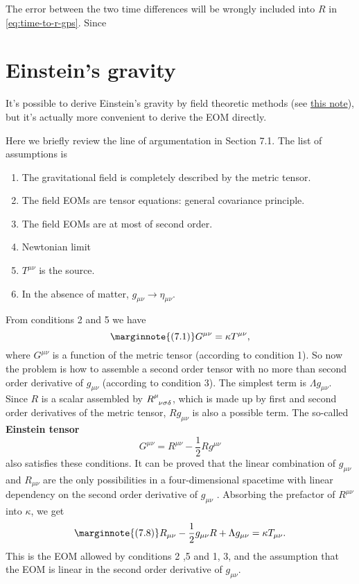 \documentclass[hyperref, a4paper]{article}
\newcommand*{\concept}[1]{{\textbf{#1}}}
\newcommand{\grnote}{\href{../relativity/relativistic.pdf}{this note}}
\begin{document}

The error between the two time differences will 
be wrongly included into $R$ in \eqref{eq:time-to-r-gps}. Since 

\section{Einstein's gravity}

It's possible to derive Einstein's gravity by field theoretic methods (see \grnote), 
but it's actually more convenient to derive the EOM directly. 

Here we briefly review the line of argumentation in Section 7.1. 
The list of assumptions is 
\begin{enumerate}
    \item The gravitational field is completely described by the metric tensor.
    \item The field EOMs are tensor equations: general covariance principle.
    \item The field EOMs are at most of second order.
    \item Newtonian limit
    \item $T^{\mu \nu}$ is the source.
    \item In the absence of matter, $g_{\mu \nu} \to \eta_{\mu \nu}$.
\end{enumerate}

From conditions 2 and 5 we have 
\begin{equation} \marginnote{(7.1)}
    G^{\mu \nu} = \kappa T^{\mu \nu},
\end{equation}
where $G^{\mu \nu}$ is a function of the metric tensor (according to condition 1). So now the problem is how to 
assemble a second order tensor with no more than second order derivative of $g_{\mu \nu}$ (according to 
condition 3). The simplest term is $\Lambda g_{\mu \nu}$. Since $R$ is a scalar assembled by 
$R\indices{^\mu_{\nu \sigma \delta}}$, which is made up by first and second order derivatives of the metric tensor,
$R g_{\mu \nu}$ is also a possible term. The so-called \concept{Einstein tensor}
\begin{equation}
    G^{\mu \nu} = R^{\mu \nu} - \frac{1}{2} R g^{\mu \nu}
\end{equation}
also satisfies these conditions. It can be proved that the linear combination of $g_{\mu \nu}$ and $R_{\mu \nu}$ are the only possibilities
in a four-dimensional spacetime with linear dependency on the second order derivative of $g_{\mu \nu}$ \cite{lovelock1972four}.
Absorbing the prefactor of $R^{\mu \nu}$ into $\kappa$, we get 
\begin{equation} \marginnote{(7.8)}
    R_{\mu \nu}-\frac{1}{2} g_{\mu \nu} R+\Lambda g_{\mu \nu} = \kappa T_{\mu \nu}.
    \label{eq:cosmos-constant}
\end{equation}
This is the EOM allowed by conditions 2 ,5 and 1, 3, and the assumption that the EOM is linear 
in the second order derivative of $g_{\mu \nu}$. 
\end{document}
